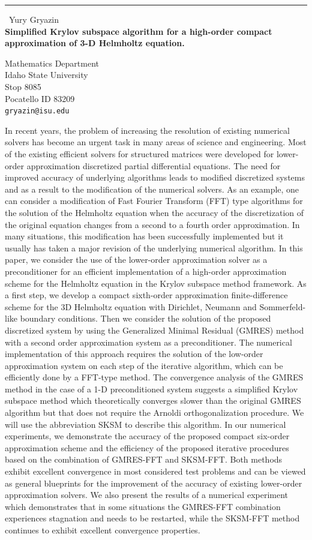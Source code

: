 \documentclass{report}
\begin{document}
\begin{center}
\rule{6in}{1pt} \
{\large Yury Gryazin \\
{\bf Simplified Krylov subspace algorithm for a high-order compact approximation of 3-D Helmholtz equation.}}

Mathematics Department \\ Idaho State University \\ Stop 8085 \\ Pocatello ID 83209
\\
{\tt gryazin@isu.edu}\end{center}

In recent years, the problem of increasing the resolution of existing
numerical solvers has become an urgent task in many areas of science and
engineering. Most of the existing efficient solvers for structured
matrices were developed for lower-order approximation discretized partial
differential equations. The need for improved accuracy of underlying
algorithms leads to modified discretized systems and as a result to the
modification of the numerical solvers. As an example, one can consider a
modification of Fast Fourier Transform (FFT) type algorithms for the
solution of the Helmholtz equation when the accuracy of the
discretization of the original equation changes from a second to a fourth
order approximation. In many situations, this modification has been
successfully implemented but it usually has taken a major revision of the
underlying numerical algorithm.
In this paper, we consider the use of the lower-order approximation
solver as a preconditioner for an efficient implementation of a
high-order approximation scheme for the Helmholtz equation in the Krylov
subspace method framework. As a first step, we develop a compact
sixth-order approximation finite-difference scheme for the 3D Helmholtz
equation with Dirichlet, Neumann and Sommerfeld-like boundary conditions.
Then we consider the solution of the proposed discretized system by using
the Generalized Minimal Residual (GMRES) method with a second order
approximation system as a preconditioner. The numerical implementation of
this approach requires the solution of the low-order approximation system
on each step of the iterative algorithm, which can be efficiently done by
a FFT-type method.
The convergence analysis of the GMRES method in the case of a 1-D
preconditioned system suggests a simplified Krylov subspace method which
theoretically converges slower than the original GMRES algorithm but that
does not require the Arnoldi orthogonalization procedure. We will use the
abbreviation SKSM to describe this algorithm.
In our numerical experiments, we demonstrate the accuracy of the proposed
compact six-order approximation scheme and the efficiency of the proposed
iterative procedures based on the combination of GMRES-FFT and SKSM-FFT.
Both methods exhibit excellent convergence in most considered test
problems and can be viewed as general blueprints for the improvement of
the accuracy of existing lower-order approximation solvers. We also
present the results of a numerical experiment which demonstrates that in
some situations the GMRES-FFT combination experiences stagnation and
needs to be restarted, while the SKSM-FFT method continues to exhibit
excellent convergence properties.
\end{document}
